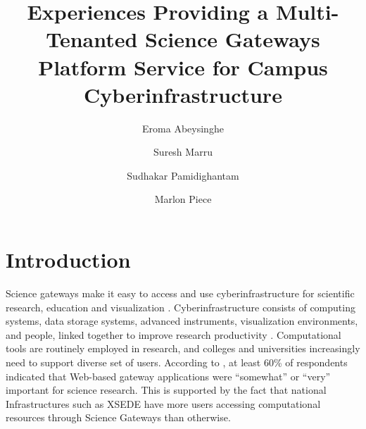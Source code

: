 \documentclass[sigconf]{acmart}
\begin{document}
\title{Experiences Providing a Multi-Tenanted Science Gateways Platform Service for Campus Cyberinfrastructure}

\author{Eroma Abeysinghe}

\author{Suresh Marru}

\author{Sudhakar Pamidighantam}

\author{Marlon Piece}


\maketitle

\section{Introduction}

Science gateways make it easy to access and use cyberinfrastructure for scientific research, education and visualization \cite{wilkins2008teragrid}. Cyberinfrastructure consists of computing systems, data storage systems, advanced instruments, visualization environments, and people, linked together to improve research productivity \cite{stewart2010cyberinfrastructure}. Computational tools are routinely employed in research, and colleges and universities increasingly need to support diverse set of users.  According to \cite{lawrence2015science}, at least 60\% of respondents indicated that Web-based gateway applications were ``somewhat'' or ``very'' important  for science research. This is supported by the fact that national Infrastructures such as XSEDE have more users accessing computational resources through Science Gateways than otherwise.
\end{document}
